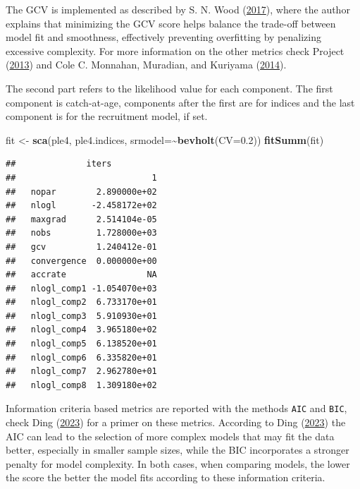 \documentclass[
]{book}
\newenvironment{Shaded}{\begin{snugshade}}{\end{snugshade}}
\newcommand{\AttributeTok}[1]{\textcolor[rgb]{0.13,0.29,0.53}{#1}}
\newcommand{\FloatTok}[1]{\textcolor[rgb]{0.00,0.00,0.81}{#1}}
\newcommand{\FunctionTok}[1]{\textcolor[rgb]{0.13,0.29,0.53}{\textbf{#1}}}
\newcommand{\NormalTok}[1]{#1}
\newcommand{\OtherTok}[1]{\textcolor[rgb]{0.56,0.35,0.01}{#1}}
\newcommand{\SpecialCharTok}[1]{\textcolor[rgb]{0.81,0.36,0.00}{\textbf{#1}}}
\begin{document}
The GCV is implemented as described by S. N. Wood (\protect\hyperlink{ref-Wood2017}{2017}), where the author explains that minimizing the GCV score helps balance the trade-off between model fit and smoothness, effectively preventing overfitting by penalizing excessive complexity. For more information on the other metrics check Project (\protect\hyperlink{ref-admb123manual}{2013}) and Cole C. Monnahan, Muradian, and Kuriyama (\protect\hyperlink{ref-monnahan2014admbmcmc}{2014}).

The second part refers to the likelihood value for each component. The first component is catch-at-age, components after the first are for indices and the last component is for the recruitment model, if set.

\begin{Shaded}
\begin{Highlighting}[]
\NormalTok{fit }\OtherTok{\textless{}{-}} \FunctionTok{sca}\NormalTok{(ple4, ple4.indices, }\AttributeTok{srmodel=}\SpecialCharTok{\textasciitilde{}}\FunctionTok{bevholt}\NormalTok{(}\AttributeTok{CV=}\FloatTok{0.2}\NormalTok{))}
\FunctionTok{fitSumm}\NormalTok{(fit)}
\end{Highlighting}
\end{Shaded}

\begin{verbatim}
##              iters
##                           1
##   nopar        2.890000e+02
##   nlogl       -2.458172e+02
##   maxgrad      2.514104e-05
##   nobs         1.728000e+03
##   gcv          1.240412e-01
##   convergence  0.000000e+00
##   accrate                NA
##   nlogl_comp1 -1.054070e+03
##   nlogl_comp2  6.733170e+01
##   nlogl_comp3  5.910930e+01
##   nlogl_comp4  3.965180e+02
##   nlogl_comp5  6.138520e+01
##   nlogl_comp6  6.335820e+01
##   nlogl_comp7  2.962780e+01
##   nlogl_comp8  1.309180e+02
\end{verbatim}

Information criteria based metrics are reported with the methods \texttt{AIC} and \texttt{BIC}, check Ding (\protect\hyperlink{ref-ding2023information}{2023}) for a primer on these metrics. According to Ding (\protect\hyperlink{ref-ding2023information}{2023}) the AIC can lead to the selection of more complex models that may fit the data better, especially in smaller sample sizes, while the BIC incorporates a stronger penalty for model complexity. In both cases, when comparing models, the lower the score the better the model fits according to these information criteria.
\end{document}

